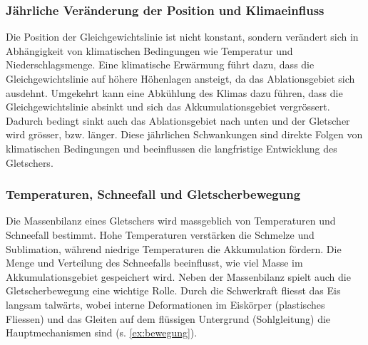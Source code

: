 \subsubsection{Jährliche Veränderung der Position und Klimaeinfluss}

Die Position der Gleichgewichtslinie ist nicht konstant, sondern verändert sich in Abhängigkeit von klimatischen Bedingungen wie Temperatur und Niederschlagsmenge. Eine klimatische Erwärmung führt dazu, dass die Gleichgewichtslinie auf höhere Höhenlagen ansteigt, da das Ablationsgebiet sich ausdehnt. Umgekehrt kann eine Abkühlung des Klimas dazu führen, dass die Gleichgewichtslinie absinkt und sich das Akkumulationsgebiet vergrössert. Dadurch bedingt sinkt auch das Ablationsgebiet nach unten und der Gletscher wird grösser, bzw. länger. Diese jährlichen Schwankungen sind direkte Folgen von klimatischen Bedingungen und beeinflussen die langfristige Entwicklung des Gletschers.

\subsubsection{Temperaturen, Schneefall und Gletscherbewegung}

Die Massenbilanz eines Gletschers wird massgeblich von Temperaturen und Schneefall bestimmt. Hohe Temperaturen verstärken die Schmelze und Sublimation, während niedrige Temperaturen die Akkumulation fördern. Die Menge und Verteilung des Schneefalls beeinflusst, wie viel Masse im Akkumulationsgebiet gespeichert wird. Neben der Massenbilanz spielt auch die Gletscherbewegung eine wichtige Rolle. Durch die Schwerkraft fliesst das Eis langsam talwärts, wobei interne Deformationen im Eiskörper (plastisches Fliessen) und das Gleiten auf dem flüssigen Untergrund (Sohlgleitung) die Hauptmechanismen sind (s. \cref{ex:bewegung}).


